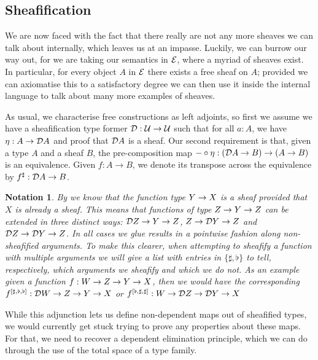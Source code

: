 \documentclass[11pt]{article}
\newtheorem{nota}[thrm]{Notation}
\begin{document}
\subsection{Sheafification}%
\label{sub:sheafification-internal}

We are now faced with the fact that there really are not any more sheaves we
can talk about internally, which leaves us at an impasse.
%
Luckily, we can burrow our way out, for we are taking our semantics in \(\mathcal{E}\),
where a myriad of sheaves exist.
%
In particular, for every object \(A\) in \(\mathcal{E}\) there exists a free sheaf on
\(A\); provided we can axiomatise this to a satisfactory degree we can then use
it inside the internal language to talk about many more examples of sheaves.

As usual, we characterise free constructions as left adjoints, so first we
assume we have a sheafification type former
\(\mathcal{D} : \mathcal{U} \to \mathcal{U}\) such that for all \(a : A\), we have
\(\eta : A \to \mathcal{D}{A}\) and proof that \(\mathcal{D}{A}\) is a sheaf.
%
Our second requirement is that, given a type \(A\) and a sheaf \(B\), the
pre-composition map
\(-\circ\eta : (\mathcal{D}{A} \to B) \to (A \to B)\) is an equivalence.
%
Given \(f : A \to B\), we denote its transpose across the equivalence by
\({f}^\sharp : \mathcal{D}{A} \to B\).

\begin{nota}
  By  we know that the function type
  \({{Y}\to{X}}\) is a sheaf provided that \(X\) is already a sheaf.
  This means that functions of type \({{Z}\to{{{Y}\to{Z}}}}\) can be extended in
  three distinct ways: \({{\mathcal{D}{Z}}\to{{{Y}\to{Z}}}}\),
  \({{Z}\to{{{\mathcal{D}{Y}}\to{Z}}}}\) and
  \({{\mathcal{D}{Z}}\to{{{\mathcal{D}{Y}}\to{Z}}}}\).
  In all cases we glue results in a pointwise fashion along non-sheafified
  arguments.
  To make this clearer, when attempting to sheafify a function
  with multiple arguments we will give a list with entries in \(\{\sharp,\flat\}\)
  to tell, respectively, which arguments we sheafify and which we do not.
  As an example given a function \(f : {{W}\to{{{Z}\to{{{Y}\to{X}}}}}}\), then
  we would have the corresponding
  \({f}^{[{\sharp,\flat,\flat}]}: {{\mathcal{D}{W}}\to{{{Z}\to{{{Y}\to{X}}}}}}\)
  or
  \({f}^{[{\flat,\sharp,\sharp}]}: {{W}\to{{{\mathcal{D}{Z}}\to{{{\mathcal{D}{Y}}\to{X}}}}}}\)
\end{nota}

While this adjunction lets us define non-dependent maps out of sheafified
types, we would currently get stuck trying to prove any properties
about these maps.
%
For that, we need to recover a dependent elimination principle, which we
can do through the use of the total space of a type family.
\end{document}
